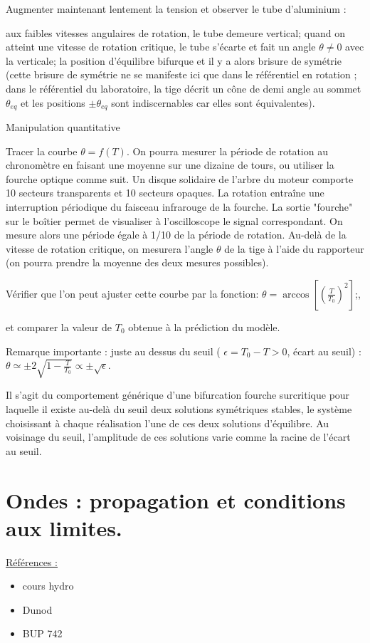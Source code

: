 \documentclass{article}%
\begin{document}
Augmenter maintenant lentement la tension et observer le tube d'aluminium :

    aux faibles vitesses angulaires de rotation, le tube demeure vertical;
    quand on atteint une vitesse de rotation critique, le tube s'écarte et fait un angle $\theta \neq 0$ avec la verticale; la position d'équilibre bifurque et il y a alors brisure de symétrie (cette brisure de symétrie ne se manifeste ici que dans le référentiel en rotation ; dans le référentiel du laboratoire, la tige décrit un cône de demi angle au sommet $\theta_{eq}$ et les positions $\pm \theta_{eq}$ sont indiscernables car elles sont équivalentes).

Manipulation quantitative

Tracer la courbe $\theta = f(T)$. On pourra mesurer la période de rotation au chronomètre en faisant une moyenne sur une dizaine de tours, ou utiliser la fourche optique comme suit. Un disque solidaire de l'arbre du moteur comporte 10 secteurs transparents et 10 secteurs opaques. La rotation entraîne une interruption périodique du faisceau infrarouge de la fourche. La sortie "fourche" sur le boîtier permet de visualiser à l'oscilloscope le signal correspondant. On mesure alors une période égale à 1/10 de la période de rotation. Au-delà de la vitesse de rotation critique, on mesurera l'angle $\theta$ de la tige à l'aide du rapporteur (on pourra prendre la moyenne des deux mesures possibles).

Vérifier que l'on peut ajuster cette courbe par la fonction:
$\theta = \arccos\left[\left( {\frac{T}{T_0}} \right)^2\right]$;,

et comparer la valeur de $T_0$ obtenue à la prédiction du modèle.

Remarque importante : juste au dessus du seuil ( $\epsilon = T_0 - T > 0$, écart au seuil) :
$ \theta \simeq \pm 2\sqrt {1-\frac{T}{T_0}} \propto \pm \sqrt{\epsilon}$.

Il s'agit du comportement générique d'une bifurcation fourche surcritique pour laquelle il existe au-delà du seuil deux solutions symétriques stables, le système choisissant à chaque réalisation l'une de ces deux solutions d'équilibre. Au voisinage du seuil, l'amplitude de ces solutions varie comme la racine de l'écart au seuil.


\section{Ondes : propagation et conditions aux limites.}
\underline{Références :}
\begin{itemize}
	\item cours hydro
	\item Dunod
	\item BUP 742
\end{itemize}
\end{document}
